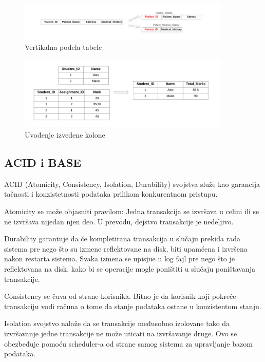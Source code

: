 \documentclass[12pt,oneside]{memoir}
\begin{document}
\begin{figure}[!ht]
  \centering
  \includegraphics[width=0.9\textwidth]{denormalizacija3.png}
  \caption{Vertikalna podela tabele}
  \label{fig:grafikon}
\end{figure}

\begin{figure}[!ht]
  \centering
  \includegraphics[width=0.9\textwidth]{denormalizacija4.png}
  \caption{Uvođenje izvedene kolone}
  \label{fig:grafikon}
\end{figure}
\pagebreak

\subsection{ACID i BASE}


ACID (Atomicity, Consistency, Isolation, Durability) svojstva služe kao garancija tačnosti i konzistetnosti podataka prilikom konkurentnom pristupu. 

Atomicity se može objasniti pravilom: Jedna transakcija se izvršava u celini ili se ne izvršava nijedan njen deo. U prevodu, dejstvo transakcije je nedeljivo. 

Durability garantuje da će kompletirana transakcija u slučaju prekida rada sistema pre nego što su izmene reflektovane na disk, biti upamćena i izvršena nakon restarta sistema. Svaka izmena se upisjue u log fajl pre nego što je reflektovana na disk, kako bi se operacije mogle poništiti u slučaju poništavanja transakcije.

Consistency se čuva od strane korisnika. Bitno je da korisnik koji pokreće transakciju vodi računa o tome da stanje podataka ostane u konzistentom stanju.

Isolation svojstvo nalaže da se transakcije međusobno izolovane tako da izvršavanje jedne transakcije ne može uticati na izvršavanje druge. Ovo se obezbeđuje pomoću scheduler-a od strane samog sistema za upravljanje bazom podataka.
\end{document}
